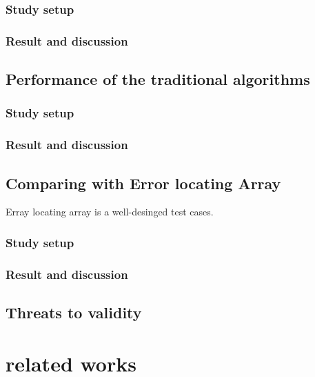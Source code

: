 \documentclass{sig-alternate}
\begin{document}
\subsubsection{Study setup}


\subsubsection{Result and discussion}


\subsection{Performance of the traditional algorithms}

\subsubsection{Study setup}

\subsubsection{Result and discussion}


\subsection{Comparing with Error locating Array}
Erray locating array is a well-desinged test cases.


\subsubsection{Study setup}



\subsubsection{Result and discussion}


\subsection{Threats to validity}


\section{related works}
\end{document}
